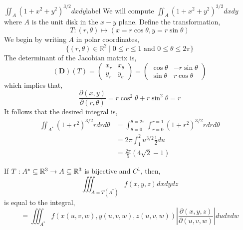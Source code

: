 \begin{ex}{$\iint_A\left(1+x^2+y^2\right)^{3 / 2} d x d y$}{label}
    We will compute $\iint_A\left(1+x^2+y^2\right)^{3 / 2} d x d y$ where $A$ is the unit disk in the $x-y$ plane. Define the transformation,
    \[T:(r, \theta) \longmapsto(x=r \cos \theta, y=r \sin \theta)\]
    We begin by writing $A$ in polar coordinates,
    \[\{(r, \theta) \in \mathbb{R}^2 \mid 0 \leq r \leq 1 \text{ and } 0 \leq \theta \leq 2 \pi\}\]
    The determinant of the Jacobian matrix is,
    \[(\mathbf{D})(T)=\left(\begin{array}{ll}
    x_r & x_\theta \\
    y_r & y_\sigma
    \end{array}\right)=\left(\begin{array}{cc}
    \cos \theta & -r \sin \theta \\
    \sin \theta & r \cos \theta
    \end{array}\right)\]
    which implies that,
    \[\frac{\partial(x, y)}{\partial(r, \theta)} = r \cos ^2 \theta+ r \sin ^2 \theta = r\]
    It follows that the desired integral is,
    \begin{align*}
        \iint_{A^*}\left(1+r^2\right)^{3 / 2} r d r d \theta
        &= \int_{\theta = 0}^{\theta = 2\pi} \int_{r = 0}^{r = 1} (1 + r^2)^{3/2} r d r d \theta \\
        &= 2 \pi \int_{1}^{2} u^{3/2}\frac{1}{2} du \\
        &= \frac{2 \pi}{5}(4 \sqrt{2}-1)
    \end{align*}
    
\end{ex}

\begin{thm}
    If $T: A^* \subseteq \mathbb{R}^3 \rightarrow A \subseteq \mathbb{R}^3$ is bijective and $C^1$, then,
    \[\iiint_{A = T(A^*)} f(x,y, z) dx dy dz\]
    is equal to the integral,
    \[= \iiint_{A^*}f(x(u,v, w), y(u,v, w), z(u, v, w)) \left|\frac{\partial(x, y, z)}{\partial(u, v, w)}\right| d u d v d w\]
\end{thm}

